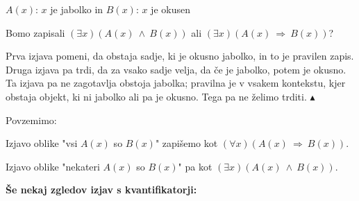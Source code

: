 \documentclass[11pt,paper=b5,footinclude,headinclude]{scrbook} %
\def\inn {{~\wedge~}}
\def\sledi {{~\Rightarrow~}}
\def\kz{{\hfill{\color{blue}$\blacktriangle$}}}%
\begin{document}
$A(x)$: $x$ je jabolko
 in
$B(x)$: $x$ je okusen

Bomo zapisali $(\exists x)(A(x)\inn B(x))$ ali $(\exists x)(A(x) \sledi B(x))$?

Prva izjava pomeni, da obstaja sadje, ki je okusno jabolko, in to je pravilen zapis.
Druga izjava pa trdi, da za vsako sadje velja, da če je jabolko, potem je okusno. Ta izjava pa ne zagotavlja obstoja jabolka;
pravilna je v vsakem kontekstu, kjer obstaja objekt, ki ni jabolko ali pa je okusno. Tega pa ne želimo trditi.
\kz

\medskip
Povzemimo:

{Izjavo oblike "vsi $A(x)$ so $B(x)$" zapišemo kot $(\forall x)(A(x)\sledi B(x))$.

Izjavo oblike "nekateri $A(x)$ so $B(x)$" pa kot $(\exists x)(A(x)\inn B(x))$.}

\medskip

\medskip
\noindent\textbf{ Še nekaj zgledov izjav s kvantifikatorji:}

\iftoggle{long}{
{\color{blue}Naj bo domena pogovora množica naravnih števil. Tedaj so naslednje izjave s kvantifikatorji smiselne:}
\begin{itemize}
  \item $(\forall$ $n)$ ($n$ je deljiv z 2).
  \item
$(\exists n)$ ($n$ je deljiv z 2).
  \item
$(\exists !n)$ ($n$ je najmanjše naravno število).
\end{itemize}

Kako bi zapisali zgornje izjave, če bi bila domena pogovora množica realnih števil z uporabo predikata
$N(n):$ ``$n$ je naravno število''?
\begin{itemize}
  \item $(\forall$ $n)$ ($N(n)\sledi n$ je deljiv z 2).
  \item
$(\exists n)$ ($N(n)\inn n$ je deljiv z 2).
  \item
$(\exists !n)$ ($N(n)\inn n$ je najmanjše naravno število).
\end{itemize}

\medskip
}
{Naj bo domena pogovora množica naravnih števil. Tedaj so naslednje izjave s kvantifikatorji smiselne:
\begin{itemize}
  \item $(\forall$ $n)$ ($n$ je deljiv z 2).
  \item
$(\exists n)$ ($n$ je deljiv z 2).
  \item
$(\exists !n)$ ($n$ je najmanjše naravno število).
\end{itemize}
Kako bi zapisali zgornje izjave, če bi bila domena pogovora množica realnih števil z uporabo predikata
$N(n):$ ``$n$ je naravno število''?
\begin{itemize}
  \item $(\forall$ $n)$ ($N(n)\sledi n$ je deljiv z 2).
  \item
$(\exists n)$ ($N(n)\inn n$ je deljiv z 2).
  \item
$(\exists !n)$ ($N(n)\inn n$ je najmanjše naravno število).
\end{itemize}
}
\end{document}
